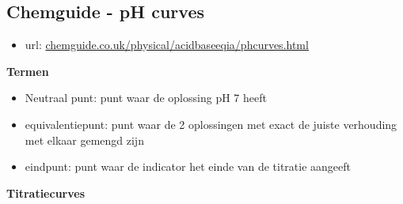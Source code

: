 \documentclass[10pt]{report}
\begin{document}
\subsection{Chemguide - pH curves}
\begin{itemize}
    \item url: \url{chemguide.co.uk/physical/acidbaseeqia/phcurves.html}
\end{itemize}
\textbf{Termen}
\begin{itemize}
    \item Neutraal punt: punt waar de oplossing pH 7 heeft
    \item equivalentiepunt: punt waar de 2 oplossingen met exact de juiste verhouding met elkaar gemengd zijn
    \item eindpunt: punt waar de indicator het einde van de titratie aangeeft
\end{itemize}
\newpage
\textbf{Titratiecurves}
\end{document}
